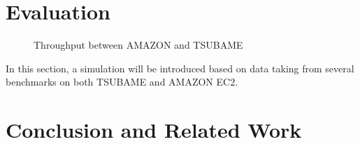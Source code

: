 \documentclass[JIP,draft]{ipsj}
\begin{document}

\section{Evaluation}
\begin{figure}[tb]
	\centering
	\caption{Throughput between AMAZON and TSUBAME}
	\label{Throughput between AMAZON and TSUBAME}
\end{figure}

In this section, a simulation will be introduced based on data taking from several benchmarks on both TSUBAME and AMAZON EC2.

\section{Conclusion and Related Work}
\end{document}
